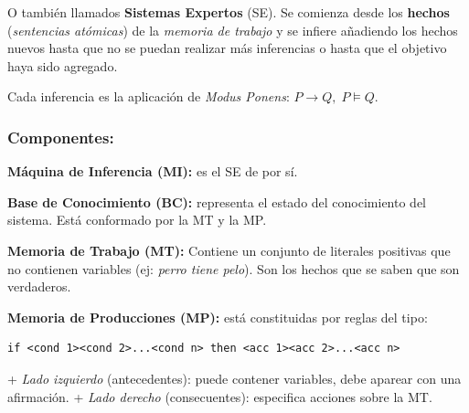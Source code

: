 \documentclass[10pt,a4paper]{article}
\begin{document}
O también llamados \textbf{Sistemas Expertos} (SE). Se comienza desde los \textbf{hechos} (\textit{sentencias atómicas}) de la \textit{memoria de trabajo} y se infiere añadiendo los hechos nuevos hasta que no se puedan realizar más inferencias o hasta que el objetivo haya sido agregado.

Cada inferencia es la aplicación de \textit{Modus Ponens}:
$P \rightarrow Q, \; P \models Q.$

\subsubsection{Componentes:}
\begin{description}
\item \textbf{Máquina de Inferencia (MI):} es el SE de por sí.
\item \textbf{Base de Conocimiento (BC):} representa el estado del conocimiento del sistema. Está conformado por la MT y la MP.
\item \textbf{Memoria de Trabajo (MT):} Contiene un conjunto de literales positivas que no contienen variables (ej: \textit{perro tiene pelo}). Son los hechos que se saben que son verdaderos.
\item \textbf{Memoria de Producciones (MP):} está constituidas por reglas del tipo:
\begin{verbatim}
if <cond 1><cond 2>...<cond n> then <acc 1><acc 2>...<acc n>
\end{verbatim}
\subitem + \textit{Lado izquierdo} (antecedentes): puede contener variables, debe aparear con una afirmación.
\subitem + \textit{Lado derecho} (consecuentes): especifica acciones sobre la MT.
\end{description}
\end{document}
